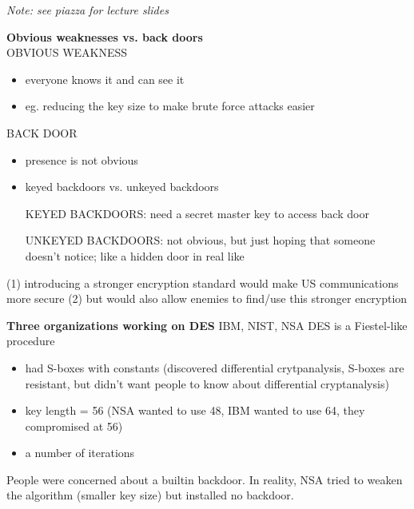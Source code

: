 \textit{Note: see piazza for lecture slides}


\textbf{Obvious weaknesses vs. back doors}\\
OBVIOUS WEAKNESS
\begin{itemize}
	\item everyone knows it and can see it
	\item eg. reducing the key size to make brute force attacks easier\\
\end{itemize}

BACK DOOR
\begin{itemize}
	\item presence is not obvious
	\item keyed backdoors vs. unkeyed backdoors

	KEYED BACKDOORS: need a secret master key to access back door

	UNKEYED BACKDOORS: not obvious, but just hoping that someone doesn't notice; like a hidden door in real like
\end{itemize}

(1) introducing a stronger encryption standard would make US communications more secure
(2) but would also allow enemies to find/use this stronger encryption

\textbf{Three organizations working on DES}
IBM, NIST, NSA
DES is a Fiestel-like procedure
\begin{itemize}
	\item had S-boxes with constants (discovered differential crytpanalysis, S-boxes are resistant, but didn't want people to know about differential cryptanalysis)
	\item key length = 56 (NSA wanted to use 48, IBM wanted to use 64, they compromised at 56)
	\item a number of iterations
\end{itemize}
People were concerned about a builtin backdoor. In reality, NSA tried to weaken the algorithm (smaller key size) but installed no backdoor.


